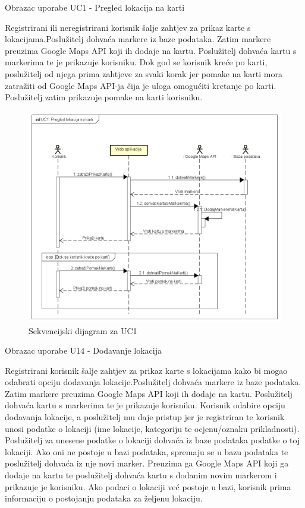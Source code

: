				Obrazac uporabe UC1 - Pregled lokacija na karti

				Registrirani ili neregistrirani korisnik šalje zahtjev za prikaz karte s lokacijama.Poslužitelj dohvaća markere iz baze podataka.
				Zatim markere preuzima Google Maps API koji ih dodaje na kartu. Poslužitelj dohvaća kartu s markerima te je prikazuje korisniku.
				Dok god se korisnik kreće po karti, poslužitelj od njega prima zahtjeve za svaki korak jer pomake na karti mora zatražiti od 
				Google Maps API-ja čija je uloga omogućiti kretanje po karti. Poslužitelj zatim prikazuje pomake na karti korisniku. 
				
				\begin{figure}[H]
					\includegraphics[scale=0.4]{slike/SekvencijskiDijagram1.png}
					\centering
					\caption{Sekvencijski dijagram za UC1}
					\label{fig:promjene}
				\end{figure}

				Obrazac uporabe U14 - Dodavanje lokacija

				Registrirani korisnik šalje zahtjev za prikaz karte s lokacijama kako bi mogao odabrati opciju dodavanja lokacije.Poslužitelj dohvaća markere iz baze podataka.
				Zatim markere preuzima Google Maps API koji ih dodaje na kartu. Poslužitelj dohvaća kartu s markerima te je prikazuje korisniku. Korisnik odabire opciju dodavanja
				lokacije, a poslužitelj mu daje pristup jer je registriran te korisnik unosi podatke o lokaciji (ime lokacije, kategoriju te ocjenu/oznaku prikladnosti). Poslužitelj 
				za unesene podatke o lokaciji dohvaća iz baze podataka podatke o toj lokaciji. Ako oni ne postoje u bazi podataka, spremaju se u bazu podataka te poslužitelj dohvaća 
				iz nje novi marker. Preuzima ga Google Maps API koji ga dodaje na kartu te poslužitelj dohvaća kartu s dodanim novim markerom i prikazuje je korisniku. Ako podaci o
				lokaciji već postoje u bazi, korisnik prima informaciju o postojanju podataka za željenu lokaciju.
				
